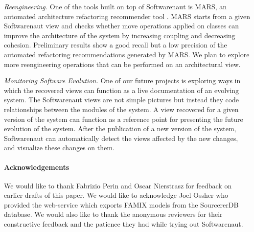\documentclass[preprint,12pt]{elsarticle}
\begin{document}
\begin{description}

\item {\em Reengineering.} One of the tools built on top of Softwarenaut is MARS, an automated architecture refactoring recommender tool \cite{boeckmann-mars}. MARS starts from a given Softwarenaut view and checks whether move operations applied on classes can improve the architecture of the system by increasing coupling and decreasing cohesion. Preliminary results show a good recall but a low precision of the automated refactoring recommendations generated by MARS. We plan to explore more reengineering operations that can be performed on an architectural view.

\item {\em Monitoring Software Evolution.} One of our future projects is exploring ways in which the recovered views can function as a live documentation of an evolving system. The Softwarenaut views are not simple pictures but instead they code relationships between the modules of the system. A view recovered for a given version of the system can function as a reference point for presenting the future evolution of the system. After the publication of a new version of the system, Softwarenaut can automatically detect the views affected by the new changes, and visualize these changes on them.

\end{description}

\paragraph{Acknowledgements} We would like to thank Fabrizio Perin and Oscar Nierstrasz for feedback on earlier drafts of this paper. We would like to acknowledge Joel Ossher who provided the web-service which exports FAMIX models from the SourcererDB database. We would also like to thank the anonymous reviewers for their constructive feedback and the patience they had while trying out Softwarenaut.



\end{document}
